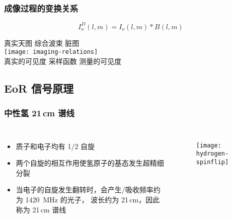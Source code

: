 \documentclass{beamer}
\begin{document}
\begin{frame}[subsec]
  \frametitle{成像过程的变换关系}
  \vspace{-1ex}
  \begin{equation}
    I_{\nu}^D(l,m) = I_{\nu}(l,m) * B(l,m)
  \end{equation}
  \begin{center}
    \footnotesize\noindent
    真实天图 \hspace{4em} 综合波束 \hspace{4.5em} 脏图 \\
    \texttt{[image: imaging-relations]} \\
    真实的可见度 \hspace{2.5em} 采样函数 \hspace{3em} 测量的可见度
  \end{center}

  \vspace*{1em}
\end{frame}

\subsection{EoR 信号原理}

\begin{frame}[subsec]
  \frametitle{中性氢 21\,cm 谱线}
  \begin{columns}[t,onlytextwidth]
    \begin{itemize}
      \item 质子和电子均有 1/2 自旋
      \item 两个自旋的相互作用使氢原子的基态发生\alert{超精细分裂}
      \item 当电子的自旋发生翻转时，会产生/吸收频率约为 \SI{1420}{\MHz} 的光子，
        波长约为 21\,cm，因此称为 \alert{21\,cm 谱线}
    \end{itemize}

    \begin{figure}
      \centering
      \texttt{[image: hydrogen-spinflip]}
    \end{figure}
  \end{columns}

\end{frame}
\end{document}

